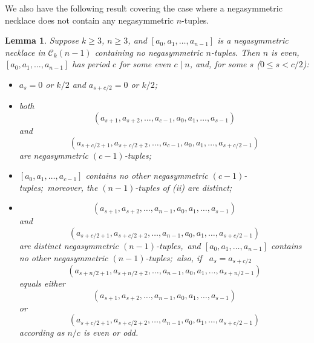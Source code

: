 \documentclass[a4paper,11pt]{article}
\theoremstyle{plain}
\newtheorem{lemma}{Lemma}[section]
\theoremstyle{definition}
\theoremstyle{remark}
\begin{document}
We also have the following result covering the case where a negasymmetric necklace does not contain
any negasymmetric $n$-tuples.

\begin{lemma}  \label{lemma:nega_circuit_no_nega_tuples}
Suppose $k\geq3$, $n\geq 3$, and $[a_0,a_1,\dots,a_{n-1}]$ is a negasymmetric necklace in
$\mathcal{C}_k(n-1)$ containing no negasymmetric $n$-tuples.  Then $n$ is even,
$[a_0,a_1,\dots,a_{n-1}]$ has  period $c$ for some even $c\mid n$, and, for some $s$ ($0\leq s<
c/2$):
\begin{itemize}
\item[(i)] $a_{s}=0$ or $k/2$ and $a_{s+c/2}=0$ or $k/2$;
\item[(ii)] both
\[ (a_{s+1},a_{s+2},\dots,a_{c-1},a_0,a_1,\dots,a_{s-1}) \]
and
\[ (a_{s+c/2+1},a_{s+c/2+2},\dots,a_{c-1},a_0,a_1,\dots,a_{s+c/2-1}) \]
are negasymmetric $(c-1)$-tuples;
\item[(iii)] $[a_0,a_1,\dots,a_{c-1}]$ contains no other negasymmetric
    $(c-1)$-tuples;~moreover, the
    $(n-1)$-tuples of (ii) are distinct;
\item[(iv)]
\[ (a_{s+1},a_{s+2},\dots,a_{n-1},a_0,a_1,\dots,a_{s-1}) \]
and
\[ (a_{s+c/2+1},a_{s+c/2+2},\dots,a_{n-1},a_0,a_1,\dots,a_{s+c/2-1}) \]
are distinct negasymmetric $(n-1)$-tuples,~and
 $[a_0,a_1,\dots,a_{n-1}]$ contains no other negasymmetric $(n-1)$-tuples;~also, if~
 $a_s=a_{s+c/2}$
\[ (a_{s+n/2+1},a_{s+n/2+2},\dots,a_{n-1},a_0,a_1,\dots,a_{s+n/2-1}) \]
 equals either
 \[ (a_{s+1},a_{s+2},\dots,a_{n-1},a_0,a_1,\dots,a_{s-1}) \]
or
\[ (a_{s+c/2+1},a_{s+c/2+2},\dots,a_{n-1},a_0,a_1,\dots,a_{s+c/2-1}) \]
according as $n/c$ is even or odd.
\end{itemize}
\end{lemma}
\end{document}
